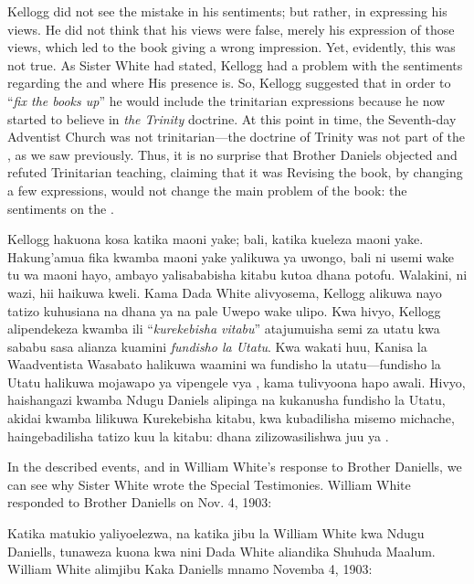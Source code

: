 Kellogg did not see the mistake in his sentiments; but rather, in expressing his views. He did not think that his views were false, merely his expression of those views, which led to the book giving a wrong impression. Yet, evidently, this was not true. As Sister White had stated, Kellogg had a problem with the sentiments regarding the  and where His presence is. So, Kellogg suggested that in order to “\textit{fix the books up}” he would include the trinitarian expressions because he now started to believe in \textit{the Trinity} doctrine. At this point in time, the Seventh-day Adventist Church was not trinitarian—the doctrine of Trinity was not part of the , as we saw previously. Thus, it is no surprise that Brother Daniels objected and refuted Trinitarian teaching, claiming that it was Revising the book, by changing a few expressions, would not change the main problem of the book: the sentiments on the .


Kellogg hakuona kosa katika maoni yake; bali, katika kueleza maoni yake. Hakung'amua fika kwamba maoni yake yalikuwa ya uwongo, bali ni usemi wake tu wa maoni hayo, ambayo yalisababisha kitabu kutoa dhana potofu. Walakini, ni wazi, hii haikuwa kweli. Kama Dada White alivyosema, Kellogg alikuwa nayo tatizo kuhusiana na dhana ya  na pale Uwepo wake ulipo. Kwa hivyo, Kellogg alipendekeza kwamba ili “\textit{kurekebisha vitabu}” atajumuisha semi za utatu kwa sababu sasa alianza kuamini \textit{fundisho la Utatu}. Kwa wakati huu, Kanisa la Waadventista Wasabato halikuwa waamini wa fundisho la utatu—fundisho la Utatu halikuwa mojawapo ya vipengele vya , kama tulivyoona hapo awali. Hivyo, haishangazi kwamba Ndugu Daniels alipinga na kukanusha fundisho la Utatu, akidai kwamba lilikuwa Kurekebisha kitabu, kwa kubadilisha misemo michache, haingebadilisha tatizo kuu la kitabu: dhana zilizowasilishwa juu ya .


In the described events, and in William White's response to Brother Daniells, we can see why Sister White wrote the Special Testimonies. William White responded to Brother Daniells on Nov. 4, 1903:


Katika matukio yaliyoelezwa, na katika jibu la William White kwa Ndugu Daniells, tunaweza kuona kwa nini Dada White aliandika Shuhuda Maalum. William White alimjibu Kaka Daniells mnamo Novemba 4, 1903:


